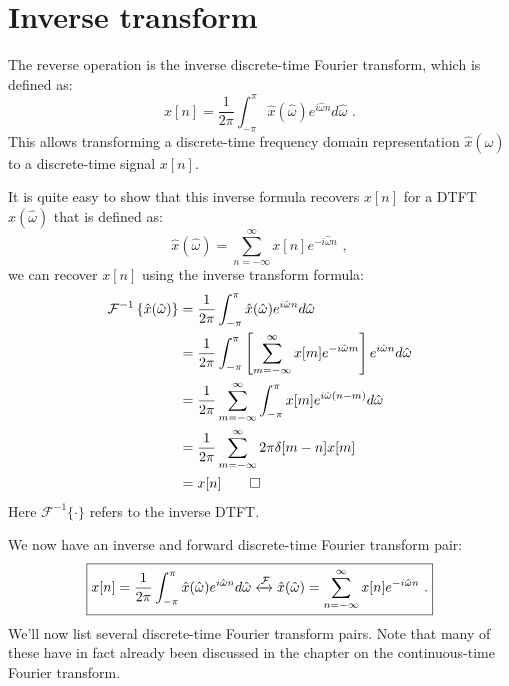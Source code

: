 \section{Inverse transform}
The reverse operation is the inverse discrete-time Fourier transform,
which is defined as:
\begin{equation}
    \boxed{
    x[n] = \frac{1}{2\pi}\int_{-\pi}^{\pi} \hat{x}(\hat{\omega})e^{i\hat{\omega}n} d\hat{\omega}\,\,.
    \label{eq:idtft_def}
    }
\end{equation}
This allows transforming a discrete-time frequency domain
representation $\hat{x}(\hat{\omega})$ to a discrete-time signal $x[n]$.

It is quite easy to show that this inverse formula recovers $x[n]$ for
a DTFT $\hat{x}(\hat{\omega})$ that is defined as:
\begin{equation}
    \hat{x}(\hat{\omega}) = \sum_{n=-\infty}^{\infty} x[n] e^{-i\hat{\omega} n}\,\,,
\end{equation}
we can recover $x[n]$ using the inverse transform formula:
\begin{align}
    \mathcal{F}^{-1}\left\{\hat{x}(\hat{\omega})\right\} & =\frac{1}{2\pi}\int_{-\pi}^{\pi} \hat{x}(\hat{\omega})e^{i\hat{\omega}n} d\hat{\omega}                                            \\
                                                         & =\frac{1}{2\pi}\int_{-\pi}^{\pi} \left[\sum_{m=-\infty}^{\infty} x[m]e^{-i\hat{\omega}m} \right] e^{i\hat{\omega}n} d\hat{\omega} \\
                                                         & =\frac{1}{2\pi}\sum_{m=-\infty}^{\infty} \int_{-\pi}^{\pi} x[m]e^{i\hat{\omega}(n-m)} d\hat{\omega}                               \\
                                                         & =\frac{1}{2\pi}\sum_{m=-\infty}^{\infty} 2\pi \delta[m-n] x[m]                                                                    \\
                                                         & =x[n]\qed
\end{align}
Here $\mathcal{F}^{-1}\{\cdot\}$ refers to the inverse DTFT.

We now have an inverse and forward discrete-time Fourier transform pair:
\begin{equation}
    \boxed{
    x[n] = \frac{1}{2\pi}\int_{-\pi}^{\pi} \hat{x}(\hat{\omega})e^{i\hat{\omega}n} d\hat{\omega} \xleftrightarrow{\mathcal{F}}
    \hat{x}(\hat{\omega}) = \sum_{n=-\infty}^{\infty} x[n] e^{-i\hat{\omega}n}\,\,.
    }
\end{equation}
We'll now list several discrete-time Fourier transform pairs. Note
that many of these have in fact already been discussed in the chapter
on the continuous-time Fourier transform.

